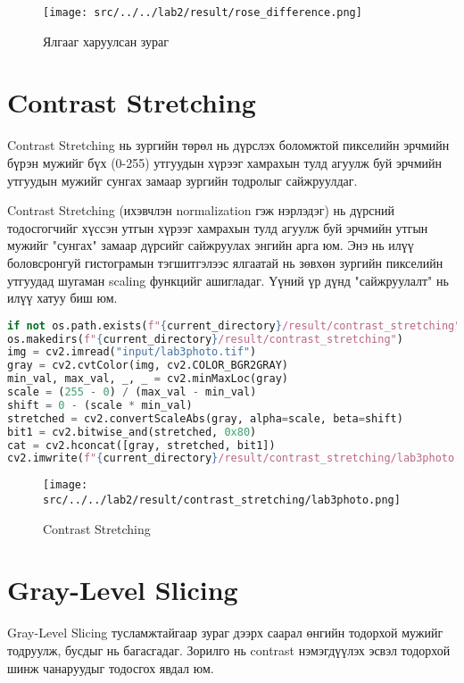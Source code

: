 \begin{figure}
	\centering
	\texttt{[image: src/../../lab2/result/rose\_difference.png]}
	\caption{Ялгааг харуулсан зураг}
\end{figure}

\pagebreak
\section{Contrast Stretching}

Contrast Stretching нь зургийн төрөл нь дүрслэх боломжтой пикселийн эрчмийн бүрэн мужийг бүх (0-255) утгуудын хүрээг хамрахын тулд агуулж буй эрчмийн утгуудын мужийг сунгах замаар зургийн тодролыг сайжруулдаг.

Contrast Stretching (ихэвчлэн normalization гэж нэрлэдэг) нь дүрсний тодосгогчийг хүссэн утгын хүрээг хамрахын тулд агуулж буй эрчмийн утгын мужийг "сунгах" замаар дүрсийг сайжруулах энгийн арга юм. Энэ нь илүү боловсронгуй гистограмын тэгшитгэлээс ялгаатай нь зөвхөн зургийн пикселийн утгуудад шугаман scaling функцийг ашигладаг. Үүний үр дүнд "сайжруулалт" нь илүү хатуу биш юм.\cite{contrast}

\begin{lstlisting}[language=Python, caption=Contrast Stretching, frame=single]
if not os.path.exists(f"{current_directory}/result/contrast_stretching"):
os.makedirs(f"{current_directory}/result/contrast_stretching")
img = cv2.imread("input/lab3photo.tif")
gray = cv2.cvtColor(img, cv2.COLOR_BGR2GRAY)
min_val, max_val, _, _ = cv2.minMaxLoc(gray)
scale = (255 - 0) / (max_val - min_val)
shift = 0 - (scale * min_val)
stretched = cv2.convertScaleAbs(gray, alpha=scale, beta=shift)
bit1 = cv2.bitwise_and(stretched, 0x80)
cat = cv2.hconcat([gray, stretched, bit1])
cv2.imwrite(f"{current_directory}/result/contrast_stretching/lab3photo.tif", cat)
\end{lstlisting}

\begin{figure}[h!]
	\centering
	\texttt{[image: src/../../lab2/result/contrast\_stretching/lab3photo.png]}
	\caption{Contrast Stretching}
\end{figure}

\pagebreak
\section{Gray-Level Slicing}

Gray-Level Slicing тусламжтайгаар зураг дээрх саарал өнгийн тодорхой мужийг тодруулж, бусдыг нь багасгадаг. Зорилго нь contrast нэмэгдүүлэх эсвэл тодорхой шинж чанаруудыг тодосгох явдал юм.

